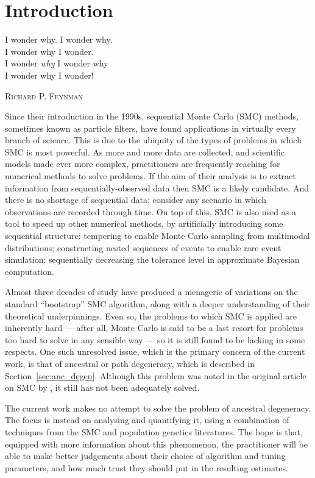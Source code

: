 \chapter{Introduction}

\epigraph{
I wonder why. I wonder why.\\
I wonder why I wonder.\\
I wonder \emph{why} I wonder why\\
I wonder why I wonder!
}
{\textsc{Richard P. Feynman}}

Since their introduction in the 1990s, sequential Monte Carlo (SMC) methods, sometimes known as particle filters, have found applications in virtually every branch of science. 
This is due to the ubiquity of the types of problems in which SMC is most powerful.
As more and more data are collected, and scientific models made ever more complex, practitioners are frequently reaching for numerical methods to solve problems.
If the aim of their analysis is to extract information from sequentially-observed data then SMC is a likely candidate. And there is no shortage of sequential data; consider any scenario in which observations are recorded through time. 
On top of this, SMC is also used as a tool to speed up other numerical methods, by artificially introducing some sequential structure: tempering to enable Monte Carlo sampling from multimodal distributions; constructing nested sequences of events to enable rare event simulation; sequentially decreasing the tolerance level in approximate Bayesian computation.

Almost three decades of study have produced a menagerie of variations on the standard ``bootstrap'' SMC algorithm, along with a deeper understanding of their theoretical underpinnings.
Even so, the problems to which SMC is applied are inherently hard --- after all, Monte Carlo is said to be a last resort for problems too hard to solve in any sensible way --- so it is still found to be lacking in some respects.
One such unresolved issue, which is the primary concern of the current work, is that of ancestral or path degeneracy, which is described in Section~\ref{sec:anc_degen}. Although this problem was noted in the original article on SMC by \textcite{gordon1993}, it still has not been adequately solved.

The current work makes no attempt to solve the problem of ancestral degeneracy. The focus is instead on analysing and quantifying it, using a combination of techniques from the SMC and population genetics literatures. 
The hope is that, equipped with more information about this phenomenon, the practitioner will be able to make better judgements about their choice of algorithm and tuning parameters, and how much trust they should put in the resulting estimates.
\\[10pt]

